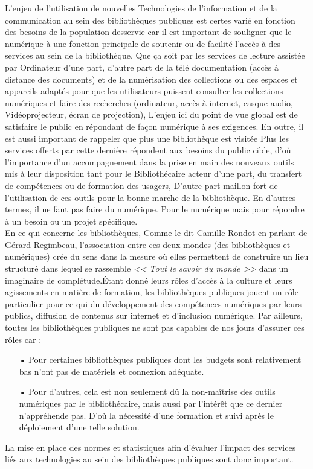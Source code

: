 \documentclass[french,a4paper,12pt]{article}
\begin{document}
 
 \quad L’enjeu de l'utilisation de nouvelles Technologies de l'information et de la communication au sein des bibliothèques publiques est certes varié en fonction des besoins de la population desservie car il est important de souligner que le numérique à une fonction principale de soutenir ou de facilité l'accès à des services au sein de la bibliothèque. Que ça soit par les services de lecture assistée par Ordinateur d'une part, d’autre part de la télé documentation (accès à distance des documents) et de la numérisation des collections ou des espaces et appareils adaptés pour que les utilisateurs puissent consulter les collections numériques et faire des recherches (ordinateur, accès à internet, casque audio, Vidéoprojecteur, écran de projection), L'enjeu ici du point de vue global est de satisfaire le public en répondant de façon numérique à ses exigences. En outre, il est aussi important de rappeler que plus une bibliothèque est visitée Plus les services offerts par cette dernière répondent aux besoins du public cible, d'où l'importance d'un accompagnement dans la prise en main des nouveaux outils mis à leur disposition tant pour le Bibliothécaire acteur d'une part, du transfert de compétences ou de formation des usagers, D'autre part maillon fort de l'utilisation de ces outils pour la bonne marche de la bibliothèque. En d’autres termes, il ne faut pas faire du numérique. Pour le numérique mais pour répondre à un besoin ou un projet spécifique.\\
En ce qui concerne les bibliothèques, Comme le dit Camille Rondot en parlant de Gérard Regimbeau, l'association entre ces deux mondes (des bibliothèques et numériques) crée du sens dans la mesure où elles permettent de construire un lieu structuré dans lequel se rassemble \textit{<< Tout le savoir du monde >> }dans un imaginaire de complétude\citep{rondot_bibliotheques_2022}.Étant donné leurs rôles d’accès à la culture et leurs agissements en matière de formation, les bibliothèques publiques jouent un rôle particulier pour ce qui du développement des compétences numériques par leurs publics, diffusion de contenus sur internet et d’inclusion numérique. Par ailleurs, toutes les bibliothèques publiques ne sont pas capables de nos jours d’assurer ces rôles car : 
\begin{enumerate}
\item[•] Pour certaines bibliothèques publiques dont les budgets sont relativement bas n’ont pas de matériels et connexion adéquate.
\item[•] Pour d’autres, cela est non seulement dû la non-maîtrise des outils numériques par le bibliothécaire, mais aussi par l’intérêt que ce dernier n’appréhende pas. D’où la nécessité d’une formation et suivi après le déploiement d’une telle solution.
\end{enumerate} 
\quad La mise en place des normes et statistiques afin d'évaluer l’impact des services liés aux technologies au sein des bibliothèques publiques sont donc important.\\
\end{document}
